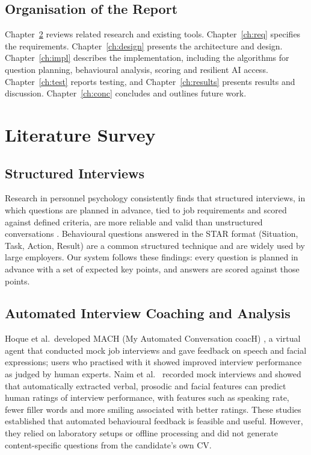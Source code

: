 \documentclass[12pt,a4paper,oneside]{report}
\begin{document}
\section{Organisation of the Report}
Chapter~\ref{ch:lit} reviews related research and existing tools. Chapter~\ref{ch:req} specifies the requirements. Chapter~\ref{ch:design} presents the architecture and design. Chapter~\ref{ch:impl} describes the implementation, including the algorithms for question planning, behavioural analysis, scoring and resilient AI access. Chapter~\ref{ch:test} reports testing, and Chapter~\ref{ch:results} presents results and discussion. Chapter~\ref{ch:conc} concludes and outlines future work.

\chapter{Literature Survey}\label{ch:lit}

\section{Structured Interviews}
Research in personnel psychology consistently finds that structured interviews, in which questions are planned in advance, tied to job requirements and scored against defined criteria, are more reliable and valid than unstructured conversations \cite{campion1997,levashina2014}. Behavioural questions answered in the STAR format (Situation, Task, Action, Result) are a common structured technique and are widely used by large employers. Our system follows these findings: every question is planned in advance with a set of expected key points, and answers are scored against those points.

\section{Automated Interview Coaching and Analysis}
Hoque et al.\ developed MACH (My Automated Conversation coacH) \cite{hoque2013}, a virtual agent that conducted mock job interviews and gave feedback on speech and facial expressions; users who practised with it showed improved interview performance as judged by human experts. Naim et al.\ \cite{naim2018} recorded mock interviews and showed that automatically extracted verbal, prosodic and facial features can predict human ratings of interview performance, with features such as speaking rate, fewer filler words and more smiling associated with better ratings. These studies established that automated behavioural feedback is feasible and useful. However, they relied on laboratory setups or offline processing and did not generate content-specific questions from the candidate's own CV.
\end{document}
